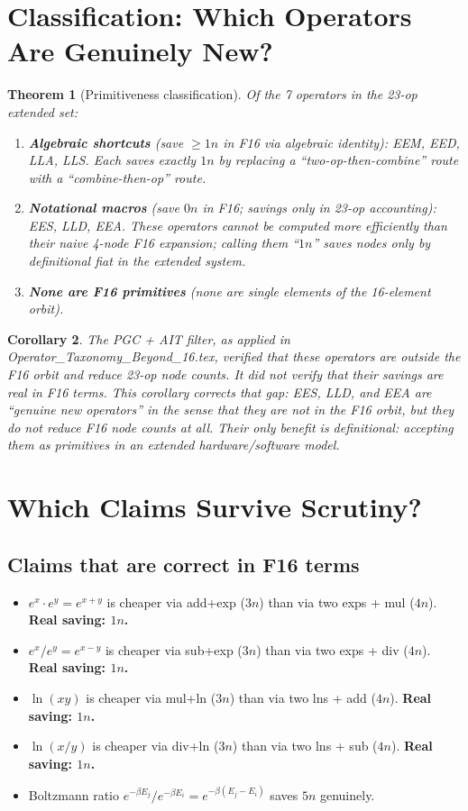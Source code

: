 \documentclass[11pt]{article}
\newtheorem{theorem}{Theorem}
\newtheorem{corollary}[theorem]{Corollary}
\begin{document}
\section{Classification: Which Operators Are Genuinely New?}

\begin{theorem}[Primitiveness classification]
Of the 7 operators in the 23-op extended set:
\begin{enumerate}
  \item \textbf{Algebraic shortcuts} (save $\geq1n$ in F16 via algebraic identity):
    EEM, EED, LLA, LLS. Each saves exactly $1n$ by replacing a ``two-op-then-combine''
    route with a ``combine-then-op'' route.
  \item \textbf{Notational macros} (save $0n$ in F16; savings only in 23-op accounting):
    EES, LLD, EEA. These operators cannot be computed more efficiently than their naive
    4-node F16 expansion; calling them ``$1n$'' saves nodes only by definitional fiat
    in the extended system.
  \item \textbf{None are F16 primitives} (none are single elements of the 16-element orbit).
\end{enumerate}
\end{theorem}

\begin{corollary}
The PGC + AIT filter, as applied in Operator\_Taxonomy\_Beyond\_16.tex, verified that
these operators are outside the F16 orbit and reduce 23-op node counts. It did \emph{not}
verify that their savings are real in F16 terms. This corollary corrects that gap:
EES, LLD, and EEA are ``genuine new operators'' in the sense that they are not in the F16 orbit,
but they do not reduce F16 node counts at all. Their only benefit is definitional:
accepting them as primitives in an extended hardware/software model.
\end{corollary}

\section{Which Claims Survive Scrutiny?}

\subsection{Claims that are correct in F16 terms}

\begin{itemize}
  \item $e^x\cdot e^y = e^{x+y}$ is cheaper via add+exp ($3n$) than via two exps + mul ($4n$). \textbf{Real saving: $1n$.}
  \item $e^x/e^y = e^{x-y}$ is cheaper via sub+exp ($3n$) than via two exps + div ($4n$). \textbf{Real saving: $1n$.}
  \item $\ln(xy)$ is cheaper via mul+ln ($3n$) than via two lns + add ($4n$). \textbf{Real saving: $1n$.}
  \item $\ln(x/y)$ is cheaper via div+ln ($3n$) than via two lns + sub ($4n$). \textbf{Real saving: $1n$.}
  \item Boltzmann ratio $e^{-\beta E_j}/e^{-\beta E_i} = e^{-\beta(E_j-E_i)}$ saves $5n$ genuinely.
\end{itemize}
\end{document}
